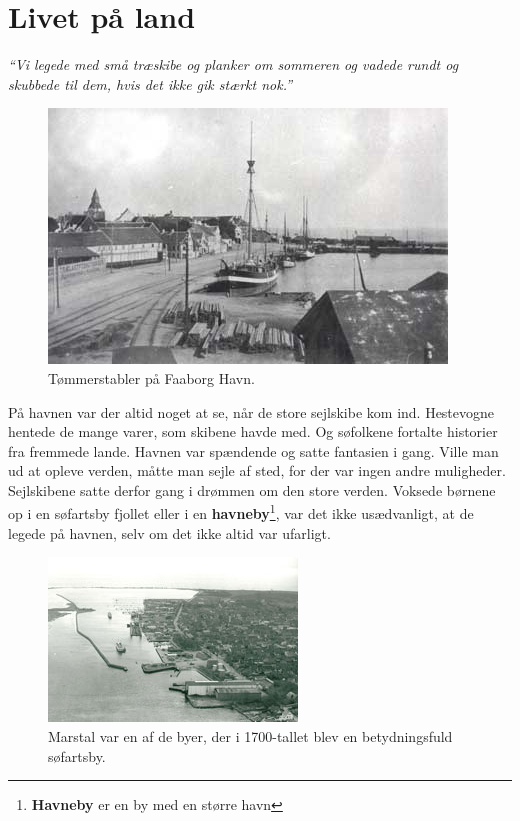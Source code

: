 \chapter{Livet på land}

\emph{``Vi legede med små træskibe og planker om sommeren og vadede
rundt og skubbede til dem, hvis det ikke gik stærkt nok.''}

\begin{figure}
\centering
\includegraphics{images/sejlskibe_tema-1-toemmer.jpg}
\caption{Tømmerstabler på Faaborg Havn.}
\end{figure}

På havnen var der altid noget at se, når de store sejlskibe kom ind.
Hestevogne hentede de mange varer, som skibene havde med. Og søfolkene
fortalte historier fra fremmede lande. Havnen var spændende og satte
fantasien i gang. Ville man ud at opleve verden, måtte man sejle af
sted, for der var ingen andre muligheder. Sejlskibene satte derfor gang
i drømmen om den store verden. Voksede børnene op i en søfartsby fjollet
eller i en \textbf{havneby}\footnote{\textbf{Havneby} er en by med en
  større havn}, var det ikke usædvanligt, at de legede på havnen, selv
om det ikke altid var ufarligt.

\begin{figure}
\centering
\includegraphics{images/sejlskibe_tema-1-marstal.jpg}
\caption{Marstal var en af de byer, der i 1700-tallet blev en
betydningsfuld søfartsby.}
\end{figure}


